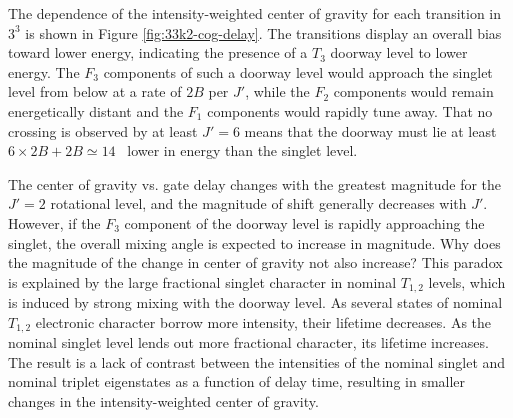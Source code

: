 \documentclass[12pt]{mitthesis}
\begin{document}
The dependence of the intensity-weighted center of gravity for each
transition in $3^3$  is shown in Figure
\ref{fig:33k2-cog-delay}.  The transitions display an overall bias
toward lower energy, indicating the presence of a $T_3$ doorway level
to lower energy.  The $F_3$ components of such a doorway level would
approach the singlet level from below at a rate of $2B$ per $J'$,
while the $F_2$ components would remain energetically distant and the
$F_1$ components would rapidly tune away.  That no crossing is
observed by at least $J'=6$ means that the doorway must lie at least
$6\times2B + 2B \simeq 14$ \rcm\ lower in energy than the singlet
level.

The center of gravity vs. gate delay changes with the greatest
magnitude for the $J'=2$ rotational level, and the magnitude of shift
generally decreases with $J'$.  However, if the $F_3$ component of the
doorway level is rapidly approaching the singlet, the overall mixing
angle is expected to increase in magnitude.  Why does the magnitude of
the change in center of gravity not also increase?  This paradox is
explained by the large fractional singlet character in nominal
$T_{1,2}$ levels, which is induced by strong mixing with the doorway
level.  As several states of nominal $T_{1,2}$ electronic character
borrow more intensity, their lifetime decreases.  As the nominal
singlet level lends out more fractional character, its lifetime
increases.  The result is a lack of contrast between the intensities
of the nominal singlet and nominal triplet eigenstates as a function
of delay time, resulting in smaller changes in the intensity-weighted
center of gravity.



\end{document}
